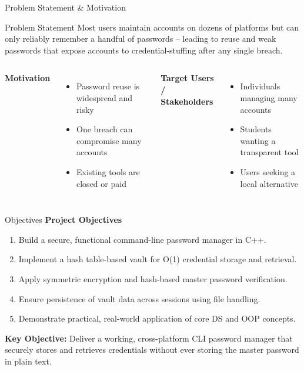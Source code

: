 \documentclass[aspectratio=169,11pt]{beamer}
\begin{document}
\begin{frame}{Problem Statement \& Motivation}
\begin{block}{Problem Statement}
\small Most users maintain accounts on dozens of platforms but can only reliably remember a handful of passwords -- leading to reuse and weak passwords that expose accounts to credential-stuffing after any single breach.
\end{block}
\vspace{1mm}
\begin{columns}[T,totalwidth=\textwidth]
\textbf{\color{GEUBlue}Motivation}
\begin{itemize}\itemsep1pt\small
\item Password reuse is widespread and risky
\item One breach can compromise many accounts
\item Existing tools are closed or paid
\end{itemize}
\textbf{\color{GEUBlue}Target Users / Stakeholders}
\begin{itemize}\itemsep1pt\small
\item Individuals managing many accounts
\item Students wanting a transparent tool
\item Users seeking a local alternative
\end{itemize}
\end{columns}
\end{frame}

\begin{frame}{Objectives}
\textbf{\color{GEUBlue}Project Objectives}
\vspace{2mm}
\begin{enumerate}\itemsep5pt
\item Build a secure, functional command-line password manager in C++.
\item Implement a hash table-based vault for O(1) credential storage and retrieval.
\item Apply symmetric encryption and hash-based master password verification.
\item Ensure persistence of vault data across sessions using file handling.
\item Demonstrate practical, real-world application of core DS and OOP concepts.
\end{enumerate}
\vfill
\begin{center}
\colorbox{GEULightBlue}{\parbox{.80\textwidth}{\centering
\textbf{Key Objective:} Deliver a working, cross-platform CLI password manager that securely stores and retrieves credentials without ever storing the master password in plain text.}}
\end{center}
\end{frame}
\end{document}
